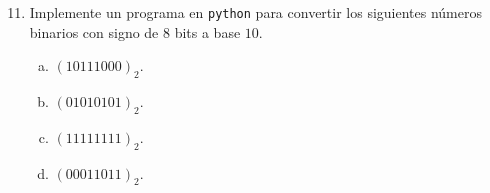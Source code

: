\documentclass[
	spanish,
	8pt,
	utf8,
	xcolor=table,
	handout,
	aspectratio=169,
	professionalfonts,
	mathserif,
	leqno,
]{beamer}
\begin{document}
\begin{frame}
	\begin{enumerate}\setcounter{enumi}{10}
		\item

		      Implemente un programa en \texttt{python} para convertir
		      los siguientes números binarios con signo de $8$ bits a
		      base $10$.

		      \begin{multicols}{4}

			      \begin{enumerate}[a)]
				      \item

				            $\left(10111000\right)_{2}$.

				      \item

				            $\left(01010101\right)_{2}$.

				      \item

				            $\left(11111111\right)_{2}$.

				      \item

				            $\left(00011011\right)_{2}$.
			      \end{enumerate}
		      \end{multicols}

	\end{enumerate}

	\begin{solution}
		\begin{minipage}{0.55\textwidth}
		\end{minipage}
		\begin{minipage}{0.35\textwidth}
		\end{minipage}
	\end{solution}
\end{frame}
\end{document}
